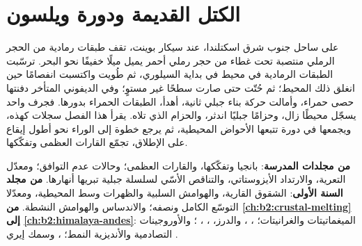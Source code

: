 \chapter{الكتل القديمة ودورة ويلسون}\label{ch:b2:wilson-cycle}

على ساحل جنوب شرق اسكتلندا، عند سيكار بوينت، تقف طبقات رمادية من الحجر الرملي منتصبة
تحت غطاء من حجر رملي أحمر يميل ميلًا خفيفًا نحو البحر. ترسّبت الطبقات الرمادية في
محيط في بداية السيلوري، ثم طُويت واكتسبت انفصامًا حين انغلق ذلك المحيط؛ ثم حُتّت
حتى صارت سطحًا غير مستوٍ؛ وفي الديفوني المتأخر دفنتها حصى حمراء، وأمالت حركة
بناء جبلي ثانية، أهدأ، الطبقات الحمراء بدورها. فجرف واحد يسجّل محيطًا
زال، وحزامًا جبليًا اندثر، والحزام الذي تلاه. يقرأ هذا الفصل سجلات كهذه،
ويجمعها في دورة تتبعها الأحواض المحيطية، ثم يرجع خطوة إلى الوراء نحو أطول إيقاع على
الإطلاق، تجمّع القارات العظمى وتفكّكها.

\begin{recall}
\textbf{من مجلدات المدرسة}: بانجيا وتفكّكها، والقارات العظمى؛ وحالات عدم التوافق؛
ومعدّل التعرية، والارتداد الأيزوستاتي، والتناقص الأسّي لسلسلة جبلية تبريها
أنهارها. \textbf{من مجلد السنة الأولى}: الشقوق القارية، والهوامش السلبية
والظهرات وسط المحيطية، ومعدّلا التوسّع الكامل ونصفه؛ والاندساس والهوامش النشطة.
\textbf{من \cref{ch:b2:crustal-melting} إلى \cref{ch:b2:himalaya-andes}}: الميغماتيتات
والغرانيتات؛ ، ، والدرز، ،  ، ؛ والأوروجينات التصادمية
والأنديزية النمط؛ ، وسمك إيري .
\end{recall}

